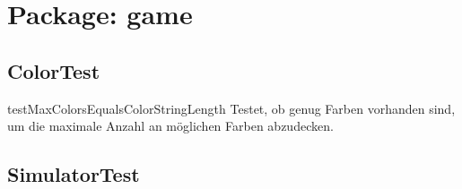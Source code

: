 \section{Package: game}

\subsection{ColorTest}

\begin{description}
\item{testMaxColorsEqualsColorStringLength}
Testet, ob genug Farben vorhanden sind, um die maximale Anzahl an möglichen Farben abzudecken.
\end{description}

\subsection{SimulatorTest}

